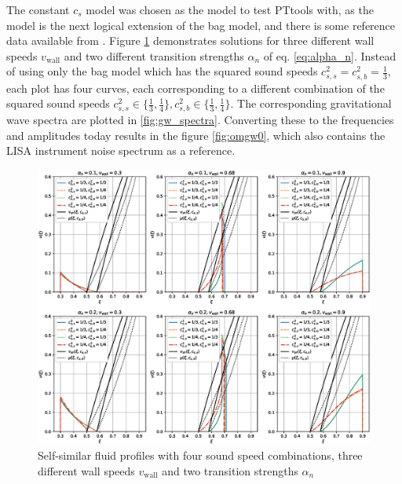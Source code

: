 The constant $c_s$ model was chosen as the model to test PTtools with,
as the model is the next logical extension of the bag model,
and there is some reference data available from \cites{giese_2020}{giese_2021}.
Figure \ref{fig:fluid_profiles} demonstrates solutions for three different wall speeds $v_\text{wall}$ and two different transition strengths $\alpha_n$ of eq. \eqref{eq:alpha_n}.
Instead of using only the bag model which has the squared sound speeds $c_{s,s}^2 = c_{s,b}^2 = \frac{1}{3}$,
each plot has four curves, each corresponding to a different combination of the squared sound speeds
$c_{s,s}^2 \in \{ \frac{1}{3}, \frac{1}{4} \}, c_{s,b}^2 \in \{ \frac{1}{3}, \frac{1}{4} \}$.
The corresponding gravitational wave spectra are plotted in \ref{fig:gw_spectra}.
Converting these to the frequencies and amplitudes today results in the figure \ref{fig:omgw0},
which also contains the LISA instrument noise spectrum as a reference.

\begin{figure}[ht!]
\centering
\includegraphics[width=\textwidth]{msc2-python/fig/const_cs_gw_v.eps}
\caption{Self-similar fluid profiles with four sound speed combinations, three different wall speeds $v_\text{wall}$ and two transition strengths $\alpha_n$}
\label{fig:fluid_profiles}
\end{figure}

